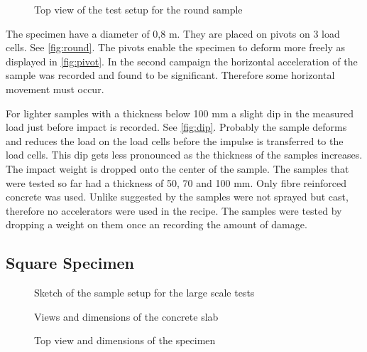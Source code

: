 \begin{figure}
    \centering
    
    \caption{Top view of the test setup for the round sample}
    \label{fig:round}
\end{figure}

The specimen have a diameter of 0,8 m. They are placed on pivots on 3 load cells. See \autoref{fig:round}. The pivots enable the specimen to deform more freely as displayed in \autoref{fig:pivot}. In the second campaign the horizontal acceleration of the sample was recorded and found to be significant. Therefore some horizontal movement must occur.

For lighter samples with a thickness below 100 mm a slight dip in the measured load just before impact is recorded. See \autoref{fig:dip}. Probably the sample deforms and reduces the load on the load cells before the impulse is transferred to the load cells. This dip gets less pronounced as the thickness of the samples increases. 
The impact weight is dropped onto the center of the sample. The samples that were tested so far had a thickness of 50, 70 and 100 mm. Only fibre reinforced concrete was used. Unlike suggested by \textcite{c1550} the samples were not sprayed but cast, therefore no accelerators were used in the recipe. The samples were tested by dropping a weight on them once an recording the amount of damage.

\subsection{Square Specimen}
\begin{figure}
    \centering
    
    \caption{Sketch of the sample setup for the large scale tests}
    \label{fig:SAMPLE}
\end{figure}


\begin{figure}
    \centering
    

\caption{Views and dimensions of the concrete slab}
\label{fig:con}
\end{figure}

\begin{figure}
    \centering
    
    \caption{Top view and dimensions of the specimen}
    \label{fig:spes}
\end{figure}

